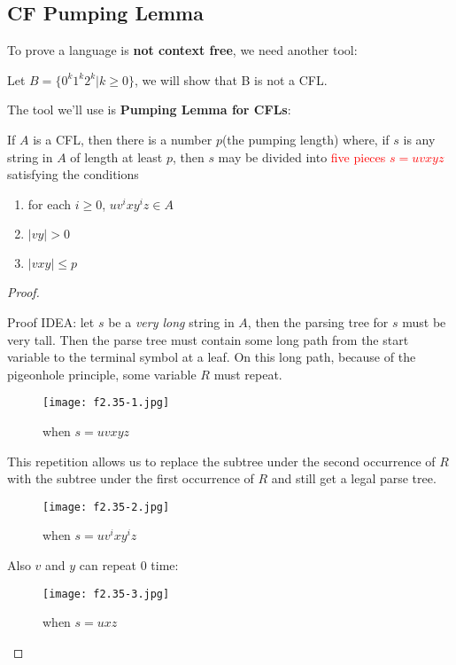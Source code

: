 \subsection{CF Pumping Lemma}
To prove a language is \textbf{not context free}, we need another tool:
\begin{example}\label{eg: 5.1}
    Let \(B = \{ 0^k 1^k 2^k | k \geq 0\} \), we will show that B is not a CFL. 
\end{example}

The tool we'll use is \textbf{Pumping Lemma for CFLs}: 
\begin{lemma}
    If \(A\) is a CFL, then there is a number \(p\)(the pumping length) where, if \(s\) is any string in \(A\) of length at least \(p\), 
    then \(s\) may be divided into \textcolor{red}{five pieces \(s = uvxyz\)} satisfying the conditions
    \begin{enumerate}
        \item for each \(i \geq 0\), \(uv^i xy^iz \in A\)
        \item \(|vy| > 0\)
        \item \(|vxy| \leq p\)   
    \end{enumerate}    
\end{lemma}
\begin{proof}
    \begin{intuition}
    
    Proof IDEA: let \(s\) be a \textit{very long} string in \(A\), then the parsing tree for \(s\) must be very tall.  
    Then the parse tree must contain some long path from the start variable to the terminal symbol at a leaf. 
    On this long path, because of the pigeonhole principle, some variable \(R\) must repeat. 

    \begin{figure}[H]
        \centering
        \texttt{[image: f2.35-1.jpg]}
        \caption{when \(s = uvxyz\) }
    \end{figure}

    This repetition allows us to replace the subtree under the second occurrence of \(R\) with the subtree under the first occurrence of \(R\) and still get a legal parse tree.  

    \begin{figure}[H]
        \centering
        \texttt{[image: f2.35-2.jpg]}
        \caption{when \(s = uv^i xy^i z\) }
    \end{figure}

    Also \(v\) and \(y\) can repeat 0 time:

    \begin{figure}[H]
        \centering
        \texttt{[image: f2.35-3.jpg]}
        \caption{when \(s = uxz\) }
    \end{figure}
    \end{intuition}
\end{proof}

